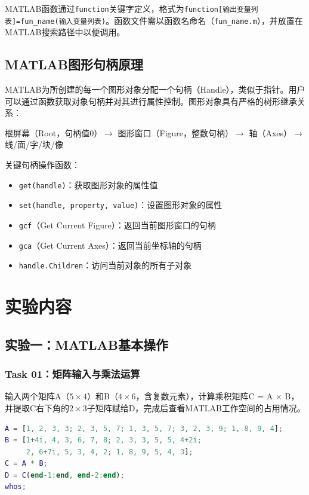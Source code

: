 \documentclass{../common/SCNU_Experimental_Report}
\begin{document}
MATLAB函数通过\texttt{function}关键字定义，格式为\texttt{function[输出变量列表]=fun\_name(输入变量列表)}。函数文件需以函数名命名（\texttt{fun\_name.m}），并放置在MATLAB搜索路径中以便调用。

\subsection{MATLAB图形句柄原理}
MATLAB为所创建的每一个图形对象分配一个句柄（Handle），类似于指针。用户可以通过函数获取对象句柄并对其进行属性控制。图形对象具有严格的树形继承关系：

\begin{center}
根屏幕（Root，句柄值0）$\rightarrow$ 图形窗口（Figure，整数句柄）$\rightarrow$ 轴（Axes）$\rightarrow$ 线/面/字/块/像
\end{center}

关键句柄操作函数：
\begin{itemize}
    \item \texttt{get(handle)}：获取图形对象的属性值
    \item \texttt{set(handle, property, value)}：设置图形对象的属性
    \item \texttt{gcf}（Get Current Figure）：返回当前图形窗口的句柄
    \item \texttt{gca}（Get Current Axes）：返回当前坐标轴的句柄
    \item \texttt{handle.Children}：访问当前对象的所有子对象
\end{itemize}

\section{实验内容}
\subsection{实验一：MATLAB基本操作}

\subsubsection{Task 01：矩阵输入与乘法运算}
输入两个矩阵A（$5\times4$）和B（$4\times6$，含复数元素），计算乘积矩阵C = A $\times$ B，并提取C右下角的$2\times3$子矩阵赋给D，完成后查看MATLAB工作空间的占用情况。

\begin{lstlisting}[language=Matlab]
A = [1, 2, 3, 3; 2, 3, 5, 7; 1, 3, 5, 7; 3, 2, 3, 9; 1, 8, 9, 4];
B = [1+4i, 4, 3, 6, 7, 8; 2, 3, 3, 5, 5, 4+2i;
     2, 6+7i, 5, 3, 4, 2; 1, 8, 9, 5, 4, 3];
C = A * B;
D = C(end-1:end, end-2:end);
whos;
\end{lstlisting}
\end{document}
